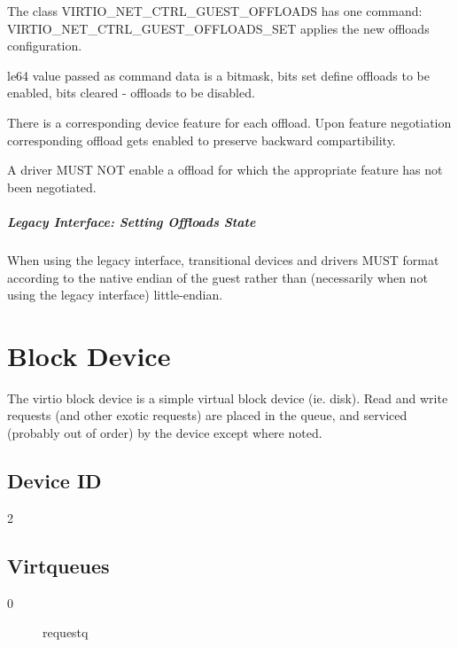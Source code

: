 The class VIRTIO_NET_CTRL_GUEST_OFFLOADS has one command:
VIRTIO_NET_CTRL_GUEST_OFFLOADS_SET applies the new offloads configuration.

le64 value passed as command data is a bitmask, bits set define
offloads to be enabled, bits cleared - offloads to be disabled.

There is a corresponding device feature for each offload. Upon feature
negotiation corresponding offload gets enabled to preserve backward
compartibility.


A driver MUST NOT enable a offload for which the appropriate feature
has not been negotiated.

\subparagraph{Legacy Interface: Setting Offloads State}\label{sec:Device Types / Network Device / Device Operation / Control Virtqueue / Offloads State Configuration / Setting Offloads State / Legacy Interface: Setting Offloads State}
When using the legacy interface, transitional devices and drivers
MUST format 
according to the native endian of the guest rather than
(necessarily when not using the legacy interface) little-endian.


\section{Block Device}\label{sec:Device Types / Block Device}

The virtio block device is a simple virtual block device (ie.
disk). Read and write requests (and other exotic requests) are
placed in the queue, and serviced (probably out of order) by the
device except where noted.

\subsection{Device ID}\label{sec:Device Types / Block Device / Device ID}
  2

\subsection{Virtqueues}\label{sec:Device Types / Block Device / Virtqueues}
\begin{description}
\item[0] requestq
\end{description}

